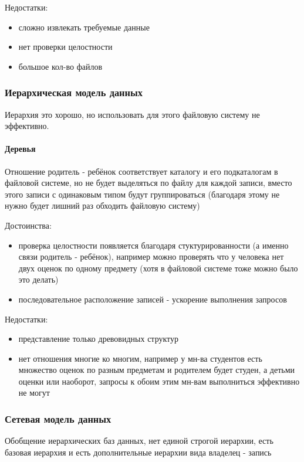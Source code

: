 Недостатки:
\begin{itemize}
	\item сложно извлекать требуемые данные
	\item нет проверки целостности
	\item большое кол-во файлов
\end{itemize}

\subsubsection{Иерархическая модель данных}
\begin{remark}
	Иерархия это хорошо, но использовать для этого файловую систему не эффективно.
\end{remark}

\paragraph{Деревья}
Отношение родитель - ребёнок соответствует каталогу и его подкаталогам в файловой системе, но не будет выделяться по файлу для каждой записи, вместо этого записи с одинаковым типом будут группироваться (благодаря этому не нужно будет лишний раз обходить файловую систему)

\enewline

Достоинства:
\begin{itemize}
	\item проверка целостности появляется благодаря стуктурированности (а именно связи родитель - ребёнок), например можно проверять что у человека нет двух оценок по одному предмету (хотя в файловой системе тоже можно было это делать)
	\item последовательное расположение записей - ускорение выполнения запросов
\end{itemize}

Недостатки:
\begin{itemize}
	\item представление только древовидных структур
	\item нет отношения многие ко многим, например у мн-ва студентов есть множество оценок по разным предметам и родителем будет студен, а детьми оценки или наоборот, запросы к обоим этим мн-вам выполниться эффективно не могут
\end{itemize}

\subsubsection{Сетевая модель данных}
Обобщение иерархических баз данных, нет единой строгой иерархии, есть базовая иерархия и есть дополнительные иерархии вида владелец - запись

